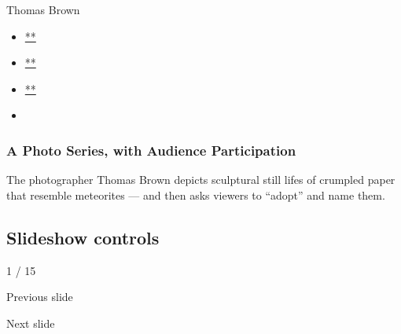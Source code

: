 Thomas Brown

\begin{itemize}
\item
  \href{https://www.facebookcorewwwi.onion/sharer.php?app_id=9869919170\&u=https\%3A\%2F\%2Fwww.nytimes3xbfgragh.onion\%2Fslideshow\%2F2016\%2F06\%2F16\%2Ft-magazine\%2Fpaper-meteorites-photos.html\%3Fsmid\%3Dfb-share\&name=A\%20Photo\%20Series\%2C\%20with\%20Audience\%20Participation\&redirect_uri=https\%3A\%2F\%2Fwww.facebookcorewwwi.onion\%2F}{**}
\item
  \href{https://twitter.com/intent/tweet?url=https\%3A\%2F\%2Fwww.nytimes3xbfgragh.onion\%2Fslideshow\%2F2016\%2F06\%2F16\%2Ft-magazine\%2Fpaper-meteorites-photos.html\%3Fsmid\%3Dtw-share\&text=A\%20Photo\%20Series\%2C\%20with\%20Audience\%20Participation}{**}
\item
  \href{mailto:?subject=nytimes3xbfgragh.onion\%3A\%20A\%20Photo\%20Series\%2C\%20with\%20Audience\%20Participation\&body=From\%20The\%20New\%20York\%20Times\%3A\%0A\%0AA\%20Photo\%20Series\%2C\%20with\%20Audience\%20Participation\%0A\%0AThe\%20photographer\%20Thomas\%20Brown\%20depicts\%20sculptural\%20still\%20lifes\%20of\%20crumpled\%20paper\%20that\%20resemble\%20meteorites\%20\%E2\%80\%94\%20and\%20then\%20asks\%20viewers\%20to\%20\%E2\%80\%9Cadopt\%E2\%80\%9D\%20and\%20name\%20them.\%0A\%0Ahttps\%3A\%2F\%2Fwww.nytimes3xbfgragh.onion\%2Fslideshow\%2F2016\%2F06\%2F16\%2Ft-magazine\%2Fpaper-meteorites-photos.html\%3Fsmid\%3Dem-share}{**}
\item
\end{itemize}

\hypertarget{a-photo-series-with-audience-participation-1}{%
\subsubsection{A Photo Series, with Audience
Participation}\label{a-photo-series-with-audience-participation-1}}

The photographer Thomas Brown depicts sculptural still lifes of crumpled
paper that resemble meteorites --- and then asks viewers to ``adopt''
and name them.

\hypertarget{slideshow-controls}{%
\subsection{Slideshow controls}\label{slideshow-controls}}

1 / 15

Previous slide

Next slide
